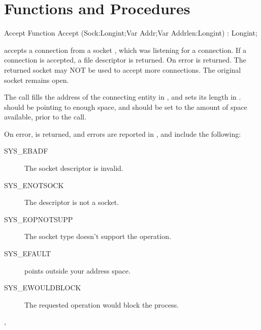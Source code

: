 \section {Functions and Procedures}
\begin{function}{Accept}
\Declaration
Function Accept (Sock:Longint;Var Addr;Var Addrlen:Longint) : Longint;

\Description
{} accepts a connection from a socket , which was
listening for a connection. If a connection is accepted, a file descriptor
is returned. On error  is returned. The returned socket may NOT 
be used to accept more connections.  The original socket remains open.

The  call fills the address of the connecting entity in 
, and sets its length in .  should 
be pointing to enough space, and  should be set to the 
amount of space available, prior to the call.

\Errors
On error,  is returned, and errors are reported in 
, and include the following:
\begin{description}
\item[SYS\_EBADF]  The socket descriptor is invalid.
\item[SYS\_ENOTSOCK]  The descriptor is not a socket.
\item[SYS\_EOPNOTSUPP]  The socket type doesn't support the 
operation.
\item[SYS\_EFAULT]   points outside your address space.
\item[SYS\_EWOULDBLOCK]  The requested operation would block the process.
\end{description}

\SeeAlso
{}, 
\end{function}

\latex{}
\html{}


